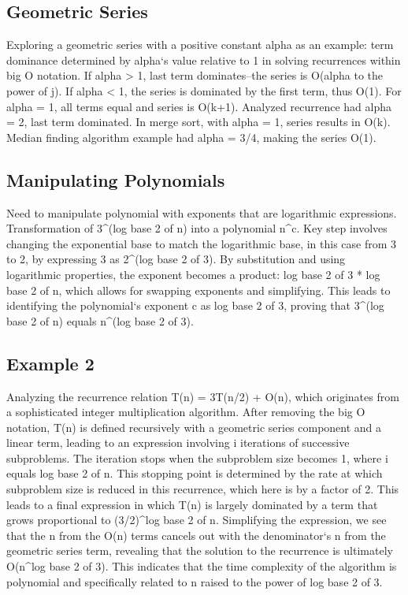\subsection*{Geometric Series}
Exploring a geometric series with a positive constant alpha as an example: term dominance determined by alpha`s value relative to 1 in solving recurrences within big O notation.
If alpha \textgreater{} 1, last term dominates--the series is O(alpha to the power of j).
If alpha \textless{} 1, the series is dominated by the first term, thus O(1).
For alpha = 1, all terms equal and series is O(k+1).
Analyzed recurrence had alpha = 2, last term dominated.
In merge sort, with alpha = 1, series results in O(k).
Median finding algorithm example had alpha = 3/4, making the series O(1).

\subsection*{Manipulating Polynomials}
Need to manipulate polynomial with exponents that are logarithmic expressions.
Transformation of 3\textasciicircum{}(log base 2 of n) into a polynomial n\textasciicircum{}c.
Key step involves changing the exponential base to match the logarithmic base, in this case from 3 to 2, by expressing 3 as 2\textasciicircum{}(log base 2 of 3).
By substitution and using logarithmic properties, the exponent becomes a product: log base 2 of 3 * log base 2 of n, which allows for swapping exponents and simplifying.
This leads to identifying the polynomial`s exponent c as log base 2 of 3, proving that 3\textasciicircum{}(log base 2 of n) equals n\textasciicircum{}(log base 2 of 3).

\subsection*{Example 2}
Analyzing the recurrence relation T(n) = 3T(n/2) + O(n), which originates from a sophisticated integer multiplication algorithm.
After removing the big O notation, T(n) is defined recursively with a geometric series component and a linear term, leading to an expression involving i iterations of successive subproblems.
The iteration stops when the subproblem size becomes 1, where i equals log base 2 of n.
This stopping point is determined by the rate at which subproblem size is reduced in this recurrence, which here is by a factor of 2.
This leads to a final expression in which T(n) is largely dominated by a term that grows proportional to (3/2)\textasciicircum{}log base 2 of n.
Simplifying the expression, we see that the n from the O(n) terms cancels out with the denominator`s n from the geometric series term, revealing that the solution to the recurrence is ultimately O(n\textasciicircum{}log base 2 of 3).
This indicates that the time complexity of the algorithm is polynomial and specifically related to n raised to the power of log base 2 of 3.

